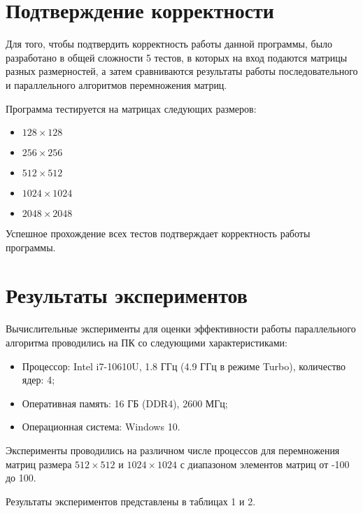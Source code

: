 \documentclass{report}
\begin{document}
\section*{Подтверждение корректности}
Для того, чтобы подтвердить корректность работы данной программы, было разработано в общей сложности 5 тестов, в которых на вход подаются матрицы разных размерностей, а затем сравниваются результаты работы последовательного и параллельного алгоритмов перемножения матриц.
\par Программа тестируется на матрицах следующих размеров:
\begin{itemize}
  \item $128 \times 128$
  \item $256 \times 256$
  \item $512 \times 512$
  \item $1024 \times 1024$
  \item $2048 \times 2048$
\end{itemize}
\par Успешное прохождение всех тестов подтверждает корректность работы программы.
\newpage

\section*{Результаты экспериментов}
Вычислительные эксперименты для оценки эффективности работы параллельного алгоритма проводились на ПК со следующими характеристиками:
\begin{itemize}
\item Процессор: Intel i7-10610U, 1.8 ГГц (4.9 ГГц в режиме Turbo), количество ядер: 4;
\item Оперативная память: 16 ГБ (DDR4), 2600 МГц;
\item Операционная система: Windows 10.
\end{itemize}

\par Эксперименты проводились на различном числе процессов для перемножения матриц размера $512 \times 512$ и $1024 \times 1024$ с диапазоном элементов матриц от -100 до 100.

\par Результаты экспериментов представлены в таблицах 1 и 2.
\end{document}
